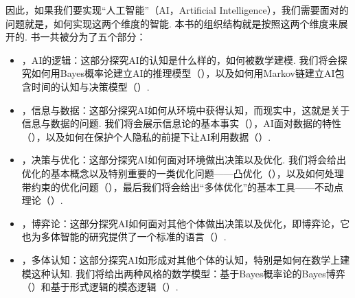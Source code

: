 因此，如果我们要实现“人工智能”（AI，Artificial Intelligence），我们需要面对的问题就是，如何实现这两个维度的智能. 本书的组织结构就是按照这两个维度来展开的. 书一共被分为了五个部分：
\begin{itemize}
    \item {}，AI的逻辑：这部分探究AI的认知是什么样的，如何被数学建模. 我们将会探究如何用Bayes概率论建立AI的推理模型（），以及如何用Markov链建立AI包含时间的认知与决策模型（）. 
    \item  {}，信息与数据：这部分探究AI如何从环境中获得认知，而现实中，这就是关于信息与数据的问题. 我们将会展示信息论的基本事实（），AI面对数据的特性（），以及如何在保护个人隐私的前提下让AI利用数据（）. 
    \item  {}，决策与优化：这部分探究AI如何面对环境做出决策以及优化. 我们将会给出优化的基本概念以及特别重要的一类优化问题——凸优化（），以及如何处理带约束的优化问题（），最后我们将会给出“多体优化”的基本工具——不动点理论（）. 
    \item  {}，博弈论：这部分探究AI如何面对其他个体做出决策以及优化，即博弈论，它也为多体智能的研究提供了一个标准的语言（）. 
    \item  {}，多体认知：这部分探究AI如形成对其他个体的认知，特别是如何在数学上建模这种认知. 我们将给出两种风格的数学模型：基于Bayes概率论的Bayes博弈（）和基于形式逻辑的模态逻辑（）. 
\end{itemize}

